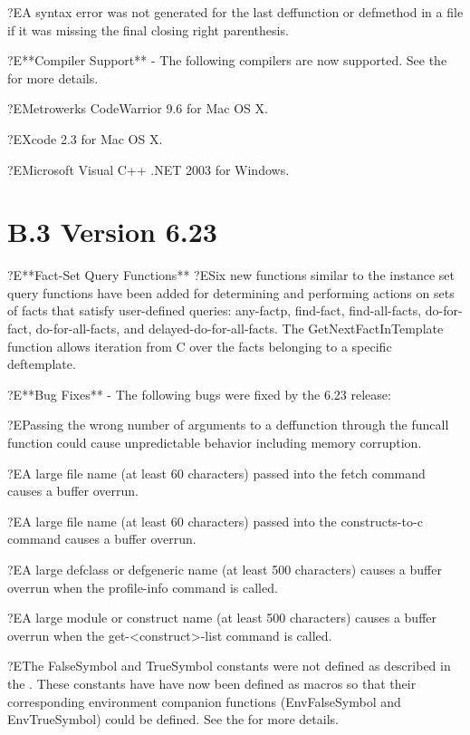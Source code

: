 \documentclass[letterpaper,10pt,english]{sphinxmanual}
\begin{document}
?EA syntax error was not generated for the last deffunction or defmethod
in a file if it was missing the final closing right parenthesis.

?E**Compiler Support** - The following compilers are now supported. See
the  for more details.

?EMetrowerks CodeWarrior 9.6 for Mac OS X.

?EXcode 2.3 for Mac OS X.

?EMicrosoft Visual C++ .NET 2003 for Windows.


\section{B.3 Version 6.23}
\label{\detokenize{appendix:b-3-version-6-23}}
?E**Fact-Set Query Functions** ?ESix new functions similar to the
instance set query functions have been added for determining and
performing actions on sets of facts that satisfy user-defined queries:
any-factp, find-fact, find-all-facts, do-for-fact, do-for-all-facts, and
delayed-do-for-all-facts. The GetNextFactInTemplate function allows
iteration from C over the facts belonging to a specific deftemplate.

?E**Bug Fixes** - The following bugs were fixed by the 6.23 release:

?EPassing the wrong number of arguments to a deffunction through the
funcall function could cause unpredictable behavior including memory
corruption.

?EA large file name (at least 60 characters) passed into the fetch
command causes a buffer overrun.

?EA large file name (at least 60 characters) passed into the
constructs-to-c command causes a buffer overrun.

?EA large defclass or defgeneric name (at least 500 characters) causes a
buffer overrun when the profile-info command is called.

?EA large module or construct name (at least 500 characters) causes a
buffer overrun when the get-\textless{}construct\textgreater{}-list command is called.

?EThe FalseSymbol and TrueSymbol constants were not defined as described
in the . These constants have have now been
defined as macros so that their corresponding environment companion
functions (EnvFalseSymbol and EnvTrueSymbol) could be defined. See the
 for more details.
\end{document}
